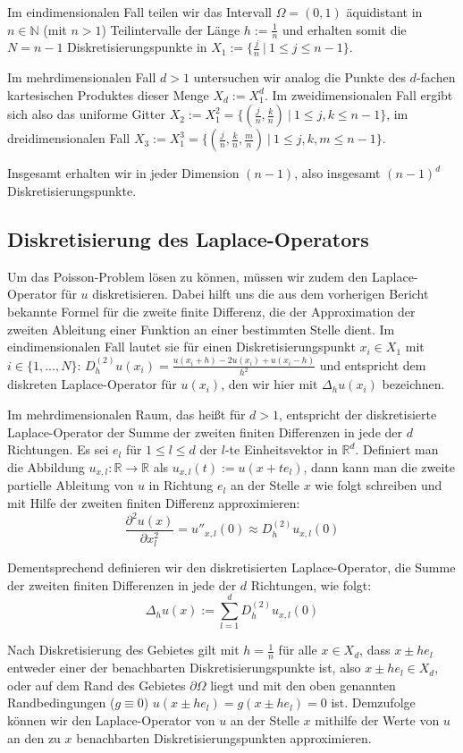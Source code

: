 \documentclass{scrartcl}
\newcommand{\R}{\mathbb{R}}
\begin{document}
Im eindimensionalen Fall teilen wir das Intervall $\Omega=(0,1)$ äquidistant in
$n\in\mathbb{N}$ (mit $n>1$) Teilintervalle der Länge $h:=\frac{1}{n}$ und erhalten somit die $N=n-1$ Diskretisierungspunkte in
$X_1:=\{\frac{j}{n} \: | \: 1\leq j \leq n-1\}$.

Im mehrdimensionalen Fall $d>1$ untersuchen wir analog die Punkte des $d$-fachen kartesischen Produktes dieser Menge $X_d := X_1^d$.
Im zweidimensionalen Fall ergibt sich also das uniforme Gitter $X_2 := X_1^2 = \{(\frac{j}{n}, \frac{k}{n}) \: | \: 1\leq j,k \leq n-1\}$,
im dreidimensionalen Fall $X_3 := X_1^3 = \{(\frac{j}{n}, \frac{k}{n}, \frac{m}{n}) \: | \: 1\leq j,k,m \leq n-1\}$.

Insgesamt erhalten wir in jeder Dimension $(n-1)$, also insgesamt $(n-1)^d$ Diskretisierungspunkte.

\subsection{Diskretisierung des Laplace-Operators}
Um das Poisson-Problem lösen zu können, müssen wir zudem den Laplace-Operator für $u$ diskretisieren.
Dabei hilft uns die aus dem vorherigen Bericht bekannte Formel für die zweite finite Differenz, die der Approximation der zweiten Ableitung einer Funktion an einer bestimmten Stelle dient.
Im eindimensionalen Fall lautet sie für einen Diskretisierungspunkt $x_i\in X_1$ mit $i \in \{1,...,N\}$:
$D_h^{(2)}u(x_i) = \frac{u(x_i+h) - 2u(x_i)+u(x_i-h)}{h^2}$ und entspricht dem diskreten Laplace-Operator für $u(x_i)$, den wir hier mit $\Delta_h u(x_i)$ bezeichnen.

Im mehrdimensionalen Raum, das heißt für $d>1$, entspricht der diskretisierte Laplace-Operator der Summe der zweiten finiten Differenzen in jede der $d$ Richtungen.
Es sei $e_l$ für $1\leq l \leq d$ der $l$-te Einheitsvektor in $\R^d$. Definiert man die Abbildung $u_{x,l}:\R\to\R$ als $u_{x,l}(t):=u(x+te_l)$, dann kann man die zweite partielle Ableitung von $u$ in Richtung $e_l$ an der Stelle $x$ wie folgt schreiben und mit Hilfe der zweiten finiten Differenz approximieren:
\[\frac{\partial^2 u(x)}{\partial x_l^2} = u''_{x,l}(0) \approx D_h^{(2)}u_{x,l}(0)\]

Dementsprechend definieren wir den diskretisierten Laplace-Operator, die Summe der zweiten finiten Differenzen in jede der $d$ Richtungen, wie folgt:
\[\Delta_h u(x):= \sum_{l=1}^{d} D_h^{(2)}u_{x,l}(0)\]

Nach Diskretisierung des Gebietes gilt mit $h=\frac{1}{n}$ für alle $x\in X_d$, dass $x\pm he_l$ entweder einer der benachbarten Diskretisierungspunkte ist, also $x\pm he_l\in X_d$, oder auf dem Rand des Gebietes $\partial\Omega$ liegt und mit den oben genannten Randbedingungen ($g\equiv0$) $u(x\pm he_l)=g(x\pm he_l)=0$ ist.
Demzufolge können wir den Laplace-Operator von $u$ an der Stelle $x$ mithilfe der Werte von $u$ an den zu $x$ benachbarten Diskretisierungspunkten approximieren.
\end{document}
